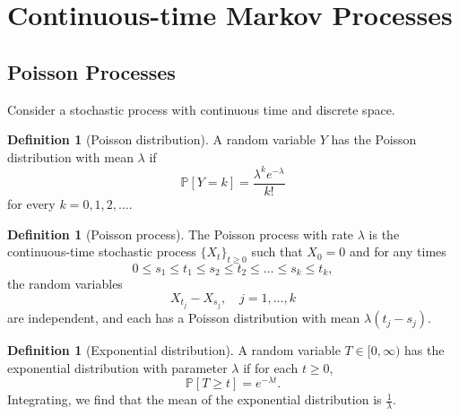 \documentclass{tufte-handout}
\renewcommand*\P{\mathbb{P}}
\theoremstyle{definition}
\newtheorem{defn}[thm]{Definition}
\begin{document}
\section{Continuous-time Markov Processes}

\subsection{Poisson Processes}

Consider a stochastic process with continuous time and discrete space.

\begin{defn}[Poisson distribution]
	A random variable $Y$ has the Poisson distribution with mean $\lambda$ if \[
		\P\left[Y = k\right] = \frac{\lambda^{k}e^{-\lambda}}{k!}
	\] for every $k=0,1,2,\ldots$.
\end{defn}

\begin{defn}[Poisson process]
	The Poisson process with rate $\lambda$ is the continuous-time stochastic process $\{X_t\}_{t\ge 0}$ such that $X_0 =0$ and for any times \[
		 0 \le s_1 \le t_1\le s_2 \le t_2\le \ldots\le s_k \le t_k
	,\] the random variables \[
		X_{t_j} - X_{s_j}, \quad j = 1,\ldots,k
	\] are independent, and each has a Poisson distribution with mean $\lambda(t_j-s_j)$.
\end{defn}


\begin{defn}[Exponential distribution]
	A random variable $T \in [0,\infty)$ has the exponential distribution with parameter $\lambda$ if for each $t\ge 0$, \[
		\P\left[T \ge t\right]  = e^{-\lambda t}
	.\] Integrating, we find that the mean of the exponential distribution is $\frac{1}{\lambda}.$
\end{defn}
\end{document}
